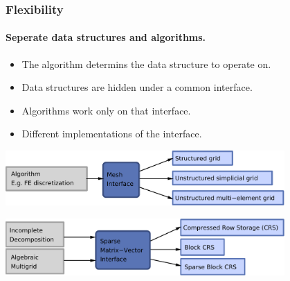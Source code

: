 \documentclass[ignorenonframetext,11pt]{beamer}
\theoremstyle{definition}
\begin{document}
\begin{frame} \frametitle{Flexibility}

  \framesubtitle<presentation>{Seperate data structures and algorithms.}


  \begin{itemize}
  \item The algorithm determins the data structure to
    operate on.
  \item Data structures are hidden under a common interface.
  \item Algorithms work only on that interface.
  \item Different implementations of the interface.
  \end{itemize} \centerline{\includegraphics[width=0.8\textwidth]{intro/abstractalgorithm}}
  \medskip
  \centerline{\includegraphics[width=0.8\textwidth]{intro/abstractmatvec}}
\end{frame}
\end{document}
